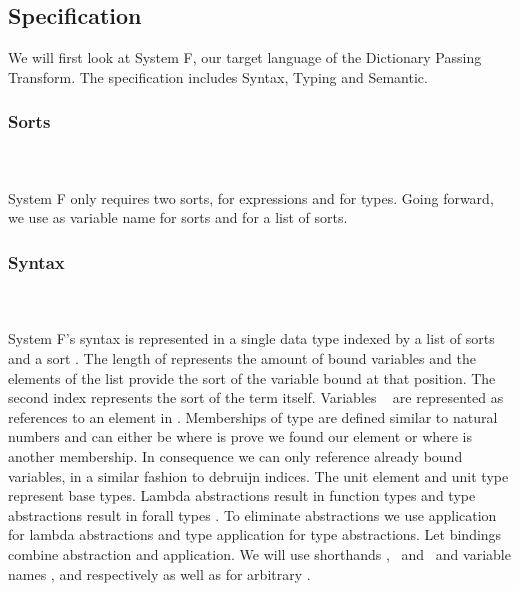 \subsection{Specification}
We will first look at System F, our target language of the Dictionary Passing Transform. 
The specification includes Syntax, Typing and Semantic. 

\subsubsection{Sorts}\hfill\\\\
System F only requires two sorts,  for expressions and  for types. 
\FSort
Going forward, we use  as variable name for sorts and  for a list of sorts.

\subsubsection{Syntax}\hfill\\\\
System F's syntax is represented in a single data type  indexed by a list of sorts  and a sort . 
The length of  represents the amount of bound variables and the elements  of the list provide the sort of the variable bound at that position. 
The second index  represents the sort of the term itself.
\FTerm
Variables \  are represented as references    to an element in .
Memberships of type    are defined similar to natural numbers and can either be  where  is prove we found our element or   where  is another membership. 
In consequence we can only reference already bound variables, in a similar fashion to debruijn indices. 
The unit element  and unit type  represent base types. Lambda abstractions   result in function types    and type abstractions   result in forall types  . 
To eliminate abstractions we use application    for lambda abstractions and type application    for type abstractions. 
Let bindings     combine abstraction and application. 
We will use shorthands \FVar, \FExpr\ and \FType\ and variable names ,  and  respectively as well as  for arbitrary   .


